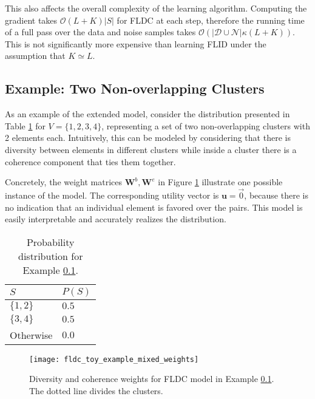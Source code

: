 This also affects the overall complexity of the learning algorithm. Computing the gradient takes $\mathcal{O}(L+K)|S|$ for FLDC at each step, therefore the running time of a full pass over the data and noise samples takes $\mathcal{O}(|\mathcal{D}\cup\mathcal{N}|\kappa(L+K))$. This is not significantly more expensive than learning FLID under the assumption that $K \simeq L$.


\subsection{Example: Two Non-overlapping Clusters}
\label{sec:fldc-toy}

As an example of the extended model, consider the distribution presented in Table \ref{tab:fldc-toy-probs} for $V = \{1,2,3,4\}$, representing a set of two non-overlapping clusters with 2 elements each. Intuitively, this can be modeled by considering that there is diversity between elements in different clusters while inside a cluster there is a coherence component that ties them together.

Concretely, the weight matrices $\mathbf{W}^{b}, \mathbf{W}^{e}$ in Figure \ref{fig:fldc-toy-mixed-weights} illustrate one possible instance of the model. The corresponding utility vector is $\mathbf{u} = \overrightarrow{0}$, because there is no indication that an individual element is favored over the pairs. This model is easily interpretable and accurately realizes the distribution.

\begin{table}
  \centering
  \caption{Probability distribution for Example \ref{sec:fldc-toy}.}
  \begin{tabular}{@{}ll@{}}
    \toprule
    $S$ & $P(S)$  \\
    \midrule
    $\{1,2\}$ & $0.5$ \\
    $\{3,4\}$ & $0.5$ \\
    Otherwise & $0.0$ \\
    \bottomrule
  \end{tabular}
  \label{tab:fldc-toy-probs}
\end{table}

\begin{figure}
  \centering
  \texttt{[image: fldc\_toy\_example\_mixed\_weights]}
  \caption{Diversity and coherence weights for FLDC model in Example \ref{sec:fldc-toy}. The dotted line divides the clusters.}
  \label{fig:fldc-toy-mixed-weights}
\end{figure}

